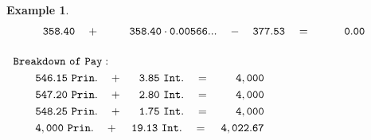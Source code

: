 \documentclass[12pt,letterpaper,oneside]{article}
\newtheorem{example}{Example}[section]
\theoremstyle{remark} %
\begin{document}
\begin{example}
\begin{align*}
	&\!\!\!\!\!\!\!\ \ \mathtt{358.40}\quad +\qquad\ \ \mathtt{358.40}\cdot \mathtt{\rate}\quad -\quad \mathtt{377.53}\quad =\quad\ \ \ \ \ \ \mathtt{0.00}\\[12pt]
	&\!\!\!\!\!\!\!\!\!\!\!\!\!\!\!\!\!\!\!\mathtt{Breakdown\ of\ Pay:}\\
	&\!\!\!\!\!\!\!\mathtt{546.15\ Prin.}\quad +\quad\;\:\mathtt{3.85\ Int.}\quad =\quad\quad\,\,\mathtt{\amount}\\
	&\!\!\!\!\!\!\!\mathtt{547.20\ Prin.}\quad +\quad\;\:\mathtt{2.80\ Int.}\quad =\quad\quad\,\,\mathtt{\amount}\\
	&\!\!\!\!\!\!\!\mathtt{548.25\ Prin.}\quad +\quad\;\:\mathtt{1.75\ Int.}\quad =\quad\quad\,\,\mathtt{\amount}\\
	&\!\!\!\!\!\!\!\mathtt{\balanceitf\ Prin.}\quad +\ \ \ \,\mathtt{19.13\ Int.}\quad =\ \ \ \,\mathtt{\amountfinal}
	\end{align*}
	\end{example}

	\normalsize
	\newpage
\end{document}

